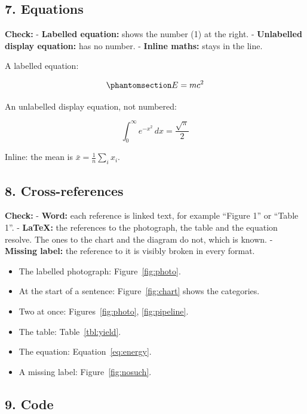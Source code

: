 \documentclass[
]{article}
\providecommand{\tightlist}{%
  \setlength{\itemsep}{0pt}\setlength{\parskip}{0pt}}
\begin{document}
\subsection{7. Equations}\label{equations}

\textbf{Check:} - \textbf{Labelled equation:} shows the number (1) at
the right. - \textbf{Unlabelled display equation:} has no number. -
\textbf{Inline maths:} stays in the line.

A labelled equation:

\begin{equation}\protect\phantomsection\label{eq:energy}{ E = mc^2 }\end{equation}

An unlabelled display equation, not numbered:

\[
\int_0^\infty e^{-x^2}\,dx = \frac{\sqrt{\pi}}{2}
\]

Inline: the mean is \(\bar{x} = \tfrac{1}{n}\sum_i x_i\).

\subsection{8. Cross-references}\label{cross-references}

\textbf{Check:} - \textbf{Word:} each reference is linked text, for
example ``Figure 1'' or ``Table 1''. - \textbf{LaTeX:} the references to
the photograph, the table and the equation resolve. The ones to the
chart and the diagram do not, which is known. - \textbf{Missing label:}
the reference to it is visibly broken in every format.

\begin{itemize}
\tightlist
\item
  The labelled photograph: Figure~\ref{fig:photo}.
\item
  At the start of a sentence: Figure~\ref{fig:chart} shows the
  categories.
\item
  Two at once: Figures~\ref{fig:photo}, \ref{fig:pipeline}.
\item
  The table: Table~\ref{tbl:yield}.
\item
  The equation: Equation~\ref{eq:energy}.
\item
  A missing label: Figure~\ref{fig:nosuch}.
\end{itemize}

\subsection{9. Code}\label{code}
\end{document}
